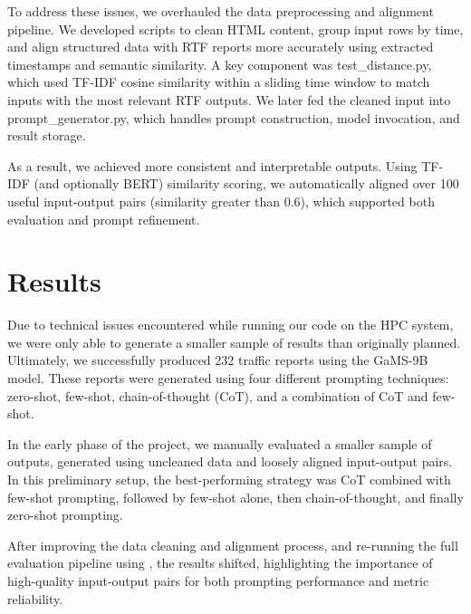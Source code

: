 \documentclass[fleqn,moreauthors,10pt]{ds_report}
\begin{document}
To address these issues, we overhauled the data preprocessing and alignment pipeline. We developed scripts to clean HTML content, group input rows by time, and align structured data with RTF reports more accurately using extracted timestamps and semantic similarity. A key component was test\_distance.py, which used TF-IDF cosine similarity within a sliding time window to match inputs with the most relevant RTF outputs. We later fed the cleaned input into prompt\_generator.py, which handles prompt construction, model invocation, and result storage.\newline

As a result, we achieved more consistent and interpretable outputs. Using TF-IDF (and optionally BERT) similarity scoring, we automatically aligned over 100 useful input-output pairs (similarity greater than 0.6), which supported both evaluation and prompt refinement.

\section*{Results}
Due to technical issues encountered while running our code on the HPC system, we were only able to generate a smaller sample of results than originally planned. Ultimately, we successfully produced 232 traffic reports using the GaMS-9B model. These reports were generated using four different prompting techniques: zero-shot, few-shot, chain-of-thought (CoT), and a combination of CoT and few-shot.\newline

In the early phase of the project, we manually evaluated a smaller sample of outputs, generated using uncleaned data and loosely aligned input-output pairs. In this preliminary setup, the best-performing strategy was CoT combined with few-shot prompting, followed by few-shot alone, then chain-of-thought, and finally zero-shot prompting.\newline

After improving the data cleaning and alignment process, and re-running the full evaluation pipeline using , the results shifted, highlighting the importance of high-quality input-output pairs for both prompting performance and metric reliability.
\end{document}
